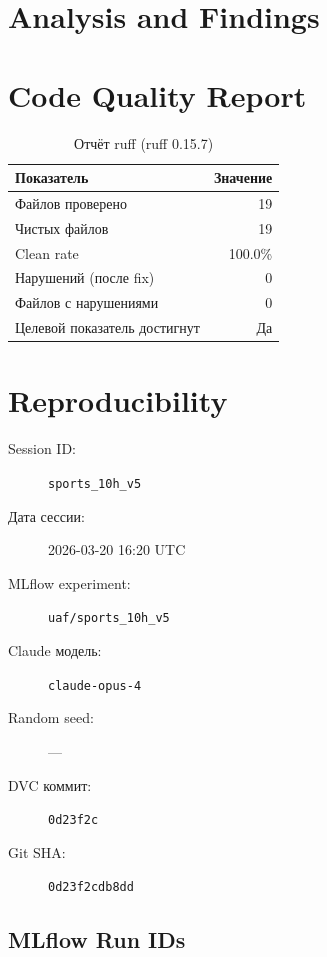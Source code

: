 \documentclass[12pt,a4paper]{article}
\begin{document}
\section{Analysis and Findings}









\section{Code Quality Report}

\begin{table}[H]
\centering
\caption{Отчёт ruff (ruff 0.15.7)}
\begin{tabular}{lr}
\toprule
Показатель & Значение \\
\midrule
Файлов проверено & 19 \\
Чистых файлов & 19 \\
Clean rate & \textcolor{passcolor}{100.0\%} \\
Нарушений (после fix) & \textcolor{passcolor}{0} \\
Файлов с нарушениями & 0 \\
Целевой показатель достигнут & \textcolor{passcolor}{Да} \\
\bottomrule
\end{tabular}
\end{table}





\section{Reproducibility}

\begin{description}
    \item[Session ID:] \texttt{sports\_10h\_v5}
    \item[Дата сессии:] 2026-03-20 16:20 UTC
    \item[MLflow experiment:] \texttt{uaf/sports\_10h\_v5}
    \item[Claude модель:] \texttt{claude-opus-4}
    \item[Random seed:] ---
    \item[DVC коммит:] \texttt{0d23f2c}
    \item[Git SHA:] \texttt{0d23f2cdb8dd}
\end{description}

\subsection*{MLflow Run IDs}
\end{document}
